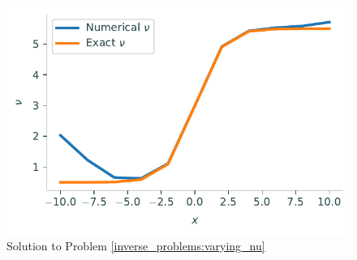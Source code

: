\begin{figure}[H]
\centering
\includegraphics[width=\textwidth]{figures/spatially_dependent_nu.pdf}
\caption{Solution to Problem \ref{inverse_problems:varying_nu}}
\label{fig:inverse_problems:find_nu}
\end{figure}
